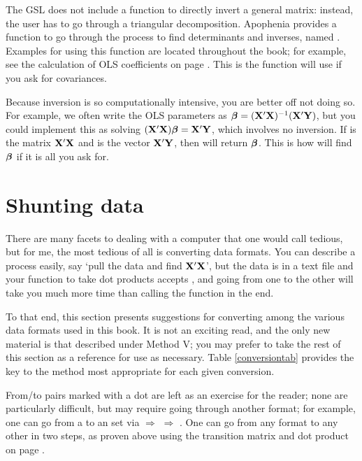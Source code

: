 The GSL does not include a function to directly invert a general matrix:
instead, the user has to go through a triangular decomposition.
Apophenia provides a function to go through the process to find
determinants and inverses, named .
Examples for using this function are located throughout the book; for
example, see the calculation of OLS coefficients on page \pageref{ols}.
This is the function  will use if you ask for covariances.

Because inversion is so computationally intensive, you are better off
not doing so.  For example, we often write the OLS parameters as ${\mbox{\boldmath$\beta$}}
=({\bf X}'{\bf X})^{-1}({\bf X}'{\bf Y})$, but you could implement this as solving
$({\bf X}'{\bf X}){\mbox{\boldmath$\beta$}} = {\bf X}'{\bf Y}$, which involves no inversion. If  is the
matrix ${\bf X}'{\bf X}$ and  is the vector ${\bf X}'{\bf Y}$, then 
 will
return ${\mbox{\boldmath$\beta$}}$. This is how  will find ${\mbox{\boldmath$\beta$}}$ if it
is all you ask for.


\section{Shunting data} \label{asst_conversions} 
There are many facets to dealing with a computer that one would call
tedious, but for me, the most tedious of all is converting data formats.
You can describe a process easily, say `pull the data and find
${\bf X}'{\bf X}$', but the data is in a text file and your function to take dot
products accepts , and going from one
to the other will take you much more time than calling the function in
the end.

To that end, this section presents
suggestions for converting among the various data formats used in this
book. It is not an exciting
read, and the only new material is that described under Method V; you may
prefer to take the rest of this section as a reference for use as
necessary. Table \ref{conversiontab} provides the key to the method most
appropriate for each given conversion.

From/to pairs marked with a dot are
left as an exercise for the reader; none are particularly difficult, but
may require going through another format; for example, one can go from a
 to an  set via  $\Rightarrow$  $\Rightarrow$ .
One can go from any format to any other in two steps, as proven above
using the transition matrix and dot product on page \pageref{twostep}. 

